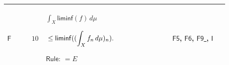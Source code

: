 \documentclass[12pt,reqno]{amsart}
\theoremstyle{blueplain}
\numberwithin{equation}{section}
\begin{document}
{\scriptsize \setlength{\parskip}{0pt}\nointerlineskip
\noindent 
\begin{tabular}{|@{}>{\centering\arraybackslash}m{0.10658\linewidth}|>{\centering\arraybackslash}m{0.03553\linewidth}|>{\centering\arraybackslash}m{0.52105\linewidth}|>{\centering\arraybackslash}m{0.23684\linewidth}|}
\hline
\hypertarget{proof:F10}{$\displaystyle \mathsf{F}$} & $\displaystyle 10$ & $%
\displaystyle \int_X\mathsf{liminf}(f)\,d\mu$\par$\displaystyle {}\le\mathsf{%
liminf}((\int_X f_n\,d\mu)_n).$\par$\displaystyle \mathsf{Rule}:\ =E$ & 
\hyperlink{proof:F5}{$\displaystyle \mathsf{F5}$}, \hyperlink{proof:F6}{$%
\displaystyle \mathsf{F6}$}, \hyperlink{proof:F9}{$\displaystyle \mathsf{F9}$%
}, \hyperlink{def:I}{$\displaystyle \mathsf{I}$} \\ \hline
\end{tabular}%
}

{\scriptsize \ }
\end{document}

